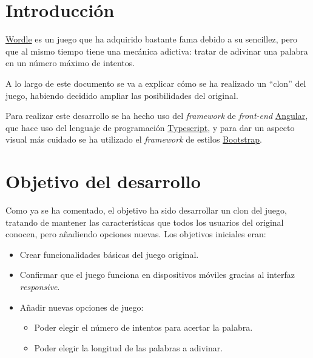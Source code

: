 \documentclass{\ClassPath/viu-tfm-template}
\begin{document}
    \graphicspath{{../../VIU_TFM_LaTeX_template/}}

    \coverpage

    \tableofcontents

\chapter{Introducción}

\href{https://www.nytimes.com/games/wordle/index.html}{Wordle} es un juego  que ha adquirido bastante fama debido a su sencillez, pero que al mismo tiempo tiene una mecánica adictiva: tratar de adivinar una palabra en un número máximo de intentos.

A lo largo de este documento se va a explicar cómo se ha realizado un “clon” del juego, habiendo decidido ampliar las posibilidades del original.

Para realizar este desarrollo se ha hecho uso del \textit{framework} de \textit{front-end} \href{https://angular.io/}{Angular}, que hace uso del lenguaje de programación \href{https://www.typescriptlang.org/}{Typescript}, y para dar un aspecto visual más cuidado se ha utilizado el \textit{framework} de estilos \href{https://getbootstrap.com/}{Bootstrap}.

\chapter{Objetivo del desarrollo}

Como ya se ha comentado, el objetivo ha sido desarrollar un clon del juego, tratando de mantener las características que todos los usuarios del original conocen, pero añadiendo opciones nuevas. Los objetivos iniciales eran:

\vspace{-1em}
\begin{itemize}
    \item Crear funcionalidades básicas del juego original.
    \item Confirmar que el juego funciona en dispositivos móviles gracias al interfaz \textit{responsive}.
    \item Añadir nuevas opciones de juego:
    \begin{itemize}
        \item Poder elegir el número de intentos para acertar la palabra.
        \item Poder elegir la longitud de las palabras a adivinar.
    \end{itemize}
\end{itemize}
\vspace{-1em}
\end{document}
